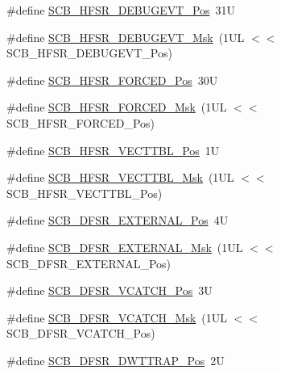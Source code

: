 \begin{DoxyCompactItemize}
\#define \mbox{\hyperlink{group___c_m_s_i_s___s_c_b_ga300c90cfb7b35c82b4d44ad16c757ffb}{S\+C\+B\+\_\+\+H\+F\+S\+R\+\_\+\+D\+E\+B\+U\+G\+E\+V\+T\+\_\+\+Pos}}~31U
\item 
\#define \mbox{\hyperlink{group___c_m_s_i_s___s_c_b_gababd60e94756bb33929d5e6f25d8dba3}{S\+C\+B\+\_\+\+H\+F\+S\+R\+\_\+\+D\+E\+B\+U\+G\+E\+V\+T\+\_\+\+Msk}}~(1\+U\+L $<$$<$ S\+C\+B\+\_\+\+H\+F\+S\+R\+\_\+\+D\+E\+B\+U\+G\+E\+V\+T\+\_\+\+Pos)
\item 
\#define \mbox{\hyperlink{group___c_m_s_i_s___s_c_b_gab361e54183a378474cb419ae2a55d6f4}{S\+C\+B\+\_\+\+H\+F\+S\+R\+\_\+\+F\+O\+R\+C\+E\+D\+\_\+\+Pos}}~30U
\item 
\#define \mbox{\hyperlink{group___c_m_s_i_s___s_c_b_ga6560d97ed043bc01152a7247bafa3157}{S\+C\+B\+\_\+\+H\+F\+S\+R\+\_\+\+F\+O\+R\+C\+E\+D\+\_\+\+Msk}}~(1\+U\+L $<$$<$ S\+C\+B\+\_\+\+H\+F\+S\+R\+\_\+\+F\+O\+R\+C\+E\+D\+\_\+\+Pos)
\item 
\#define \mbox{\hyperlink{group___c_m_s_i_s___s_c_b_ga77993da8de35adea7bda6a4475f036ab}{S\+C\+B\+\_\+\+H\+F\+S\+R\+\_\+\+V\+E\+C\+T\+T\+B\+L\+\_\+\+Pos}}~1U
\item 
\#define \mbox{\hyperlink{group___c_m_s_i_s___s_c_b_gaac5e289211d0a63fe879a9691cb9e1a9}{S\+C\+B\+\_\+\+H\+F\+S\+R\+\_\+\+V\+E\+C\+T\+T\+B\+L\+\_\+\+Msk}}~(1\+U\+L $<$$<$ S\+C\+B\+\_\+\+H\+F\+S\+R\+\_\+\+V\+E\+C\+T\+T\+B\+L\+\_\+\+Pos)
\item 
\#define \mbox{\hyperlink{group___c_m_s_i_s___s_c_b_ga13f502fb5ac673df9c287488c40b0c1d}{S\+C\+B\+\_\+\+D\+F\+S\+R\+\_\+\+E\+X\+T\+E\+R\+N\+A\+L\+\_\+\+Pos}}~4U
\item 
\#define \mbox{\hyperlink{group___c_m_s_i_s___s_c_b_ga3cba2ec1f588ce0b10b191d6b0d23399}{S\+C\+B\+\_\+\+D\+F\+S\+R\+\_\+\+E\+X\+T\+E\+R\+N\+A\+L\+\_\+\+Msk}}~(1\+U\+L $<$$<$ S\+C\+B\+\_\+\+D\+F\+S\+R\+\_\+\+E\+X\+T\+E\+R\+N\+A\+L\+\_\+\+Pos)
\item 
\#define \mbox{\hyperlink{group___c_m_s_i_s___s_c_b_gad02d3eaf062ac184c18a7889c9b6de57}{S\+C\+B\+\_\+\+D\+F\+S\+R\+\_\+\+V\+C\+A\+T\+C\+H\+\_\+\+Pos}}~3U
\item 
\#define \mbox{\hyperlink{group___c_m_s_i_s___s_c_b_gacbb931575c07b324ec793775b7c44d05}{S\+C\+B\+\_\+\+D\+F\+S\+R\+\_\+\+V\+C\+A\+T\+C\+H\+\_\+\+Msk}}~(1\+U\+L $<$$<$ S\+C\+B\+\_\+\+D\+F\+S\+R\+\_\+\+V\+C\+A\+T\+C\+H\+\_\+\+Pos)
\item 
\#define \mbox{\hyperlink{group___c_m_s_i_s___s_c_b_gaccf82364c6d0ed7206f1084277b7cc61}{S\+C\+B\+\_\+\+D\+F\+S\+R\+\_\+\+D\+W\+T\+T\+R\+A\+P\+\_\+\+Pos}}~2U
\item 
$$
\end{DoxyCompactItemize}

